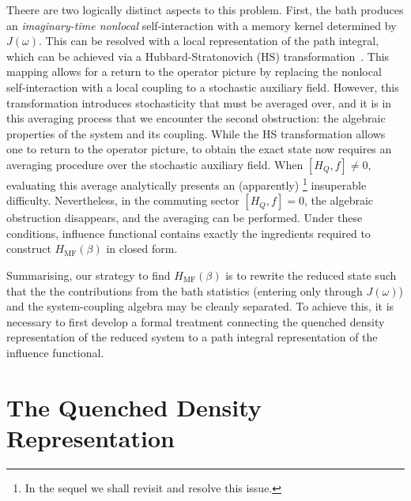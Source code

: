 \documentclass[aps,prl,twocolumn,superscriptaddress,showpacs,floatfix]{revtex4-2}
\begin{document}
Theere are two logically distinct aspects to this problem. First, the bath produces an \emph{imaginary-time nonlocal} self-interaction with a memory kernel determined by $J(\omega)$. This can be resolved with a local representation of the path integral, which can be achieved via a Hubbard-Stratonovich (HS) transformation~\cite{hubbardCalculationPartitionFunctions1959a, stratonovich1957QDistro}. This mapping allows for a return to the operator picture by replacing the nonlocal self-interaction with a local coupling to a stochastic auxiliary field. However, this transformation introduces stochasticity that must be averaged over, and it is in this averaging process that we encounter the second obstruction: the algebraic properties of the system and its coupling. While the HS transformation allows one to return to the operator picture, to obtain the exact state now requires an averaging procedure over the stochastic auxiliary field. When $[H_Q,f]\neq 0$, evaluating this average analytically presents an (apparently) \footnote{In the sequel we shall revisit and resolve this issue.} insuperable difficulty. Nevertheless, in the commuting sector $[H_Q,f]=0$, the algebraic obstruction disappears, and the averaging can be performed. Under these conditions, influence functional contains exactly the ingredients required to construct $H_{\mathrm{MF}}(\beta)$ in closed form.

Summarising, our strategy to find $H_{\mathrm{MF}}(\beta)$ is to rewrite the reduced state such that the the contributions from the bath statistics (entering only through $J(\omega)$) and the system-coupling algebra may be cleanly separated. To achieve this, it is necessary to first develop a formal treatment connecting the quenched density representation of the reduced system to a path integral representation of the influence functional. 


 \section{\label{sec:quenched}The Quenched Density Representation}
\end{document}
